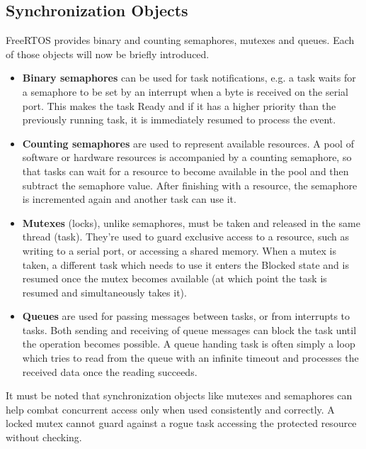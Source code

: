 \subsection{Synchronization Objects}

FreeRTOS provides binary and counting semaphores, mutexes and queues. Each of those objects will now be briefly introduced.

\begin{itemize}
	\item \textbf{Binary semaphores} can be used for task notifications, e.g. a task waits for a semaphore to be set by an interrupt when a byte is received on the serial port. This makes the task Ready and if it has a higher priority than the previously running task, it is immediately resumed to process the event.
	
	\item  \textbf{Counting semaphores} are used to represent available resources. A pool of software or hardware resources is accompanied by a counting semaphore, so that tasks can wait for a resource to become available in the pool and then subtract the semaphore value. After finishing with a resource, the semaphore is incremented again and another task can use it.
	
	\item \textbf{Mutexes} (locks), unlike semaphores, must be taken and released in the same thread (task). They're used to guard exclusive access to a resource, such as writing to a serial port, or accessing a shared memory. When a mutex is taken, a different task which needs to use it enters the Blocked state and is resumed once the mutex becomes available (at which point the task is resumed and simultaneously takes it).
	
	\item \textbf{Queues} are used for passing messages between tasks, or from interrupts to tasks. Both sending and receiving of queue messages can block the task until the operation becomes possible. A queue handing task is often simply a loop which tries to read from the queue with an infinite timeout and processes the received data once the reading succeeds.
\end{itemize}

It must be noted that synchronization objects like mutexes and semaphores can help combat concurrent access only when used consistently and correctly. A locked mutex cannot guard against a rogue task accessing the protected resource without checking.

